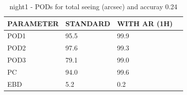 \begin{table}[p!]
\begin{center}
\begin{tabular}{|l|l|l|l|}
\hline
\multicolumn{1}{|c|}{\cellcolor[HTML]{C0C0C0}\textbf{PARAMETER}} & \multicolumn{1}{c|}{\cellcolor[HTML]{C0C0C0}\textbf{STANDARD}} & \multicolumn{1}{c|}{\cellcolor[HTML]{C0C0C0}\textbf{WITH AR (1H)}} \\
\hline
\cellcolor[HTML]{C0C0C0}POD1  & 95.5                                & 99.9         \\
\cellcolor[HTML]{C0C0C0}POD2  & 97.6                                & 99.3         \\
\cellcolor[HTML]{C0C0C0}POD3  & 79.1                                & 99.0         \\
\cellcolor[HTML]{C0C0C0}PC    & 94.0                                  & 99.6           \\
\cellcolor[HTML]{C0C0C0}EBD   & 5.2                                 & 0.2          \\
\hline
\end{tabular}
\caption{night1 - PODs for total seeing (arcsec) and accuray 0.24}
\label{tab:podsee0.24:night1}
\end{center}
\end{table}
